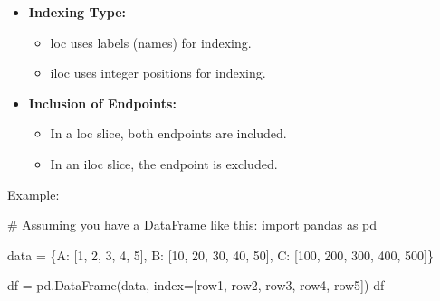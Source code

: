\documentclass[
  letterpaper,
  DIV=11,
  numbers=noendperiod]{scrreprt}
\newenvironment{Shaded}{\begin{snugshade}}{\end{snugshade}}
\newcommand{\CommentTok}[1]{\textcolor[rgb]{0.37,0.37,0.37}{#1}}
\newcommand{\DecValTok}[1]{\textcolor[rgb]{0.68,0.00,0.00}{#1}}
\newcommand{\ImportTok}[1]{\textcolor[rgb]{0.00,0.46,0.62}{#1}}
\newcommand{\NormalTok}[1]{\textcolor[rgb]{0.00,0.23,0.31}{#1}}
\newcommand{\OperatorTok}[1]{\textcolor[rgb]{0.37,0.37,0.37}{#1}}
\newcommand{\StringTok}[1]{\textcolor[rgb]{0.13,0.47,0.30}{#1}}
\providecommand{\tightlist}{%
  \setlength{\itemsep}{0pt}\setlength{\parskip}{0pt}}\usepackage{longtable,booktabs,array}
\begin{document}
\begin{itemize}
\item
  \textbf{Indexing Type:}

  \begin{itemize}
  \tightlist
  \item
    loc uses labels (names) for indexing.
  \item
    iloc uses integer positions for indexing.
  \end{itemize}
\item
  \textbf{Inclusion of Endpoints:}

  \begin{itemize}
  \tightlist
  \item
    In a loc slice, both endpoints are included.
  \item
    In an iloc slice, the endpoint is excluded.
  \end{itemize}
\end{itemize}

Example:

\begin{Shaded}
\begin{Highlighting}[]
\CommentTok{\# Assuming you have a DataFrame like this:}
\ImportTok{import}\NormalTok{ pandas }\ImportTok{as}\NormalTok{ pd}

\NormalTok{data }\OperatorTok{=}\NormalTok{ \{}\StringTok{\textquotesingle{}A\textquotesingle{}}\NormalTok{: [}\DecValTok{1}\NormalTok{, }\DecValTok{2}\NormalTok{, }\DecValTok{3}\NormalTok{, }\DecValTok{4}\NormalTok{, }\DecValTok{5}\NormalTok{],}
        \StringTok{\textquotesingle{}B\textquotesingle{}}\NormalTok{: [}\DecValTok{10}\NormalTok{, }\DecValTok{20}\NormalTok{, }\DecValTok{30}\NormalTok{, }\DecValTok{40}\NormalTok{, }\DecValTok{50}\NormalTok{],}
        \StringTok{\textquotesingle{}C\textquotesingle{}}\NormalTok{: [}\DecValTok{100}\NormalTok{, }\DecValTok{200}\NormalTok{, }\DecValTok{300}\NormalTok{, }\DecValTok{400}\NormalTok{, }\DecValTok{500}\NormalTok{]\}}

\NormalTok{df }\OperatorTok{=}\NormalTok{ pd.DataFrame(data, index}\OperatorTok{=}\NormalTok{[}\StringTok{\textquotesingle{}row1\textquotesingle{}}\NormalTok{, }\StringTok{\textquotesingle{}row2\textquotesingle{}}\NormalTok{, }\StringTok{\textquotesingle{}row3\textquotesingle{}}\NormalTok{, }\StringTok{\textquotesingle{}row4\textquotesingle{}}\NormalTok{, }\StringTok{\textquotesingle{}row5\textquotesingle{}}\NormalTok{])}
\NormalTok{df}
\end{Highlighting}
\end{Shaded}
\end{document}
